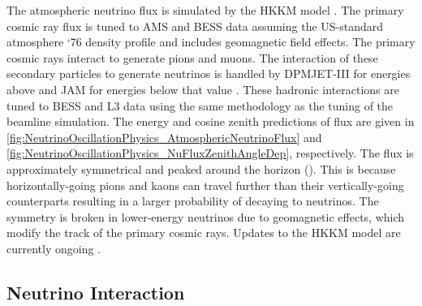 The atmospheric neutrino flux is simulated by the HKKM model \cite{Honda_2007, Honda:2011}. The primary cosmic ray flux is tuned to AMS \cite{Blau2002} and BESS \cite{Haino2004} data assuming the US-standard atmosphere `76 \cite{USStandardAtm} density profile and includes geomagnetic field effects. The primary cosmic rays interact to generate pions and muons. The interaction of these secondary particles to generate neutrinos is handled by DPMJET-III \cite{Roesler2001} for energies above  and JAM \cite{Niita2006, Honda:2011} for energies below that value . These hadronic interactions are tuned to BESS and L3 data \cite{Sanuki_2002, Achard_2004} using the same methodology as the tuning of the beamline simulation. The energy and cosine zenith predictions of  flux are given in \autoref{fig:NeutrinoOscillationPhysics_AtmosphericNeutrinoFlux} and \autoref{fig:NeutrinoOscillationPhysics_NuFluxZenithAngleDep}, respectively. The flux is approximately symmetrical and peaked around the horizon (). This is because horizontally-going pions and kaons can travel further than their vertically-going counterparts resulting in a larger probability of decaying to neutrinos. The symmetry is broken in lower-energy neutrinos due to geomagnetic effects, which modify the track of the primary cosmic rays. Updates to the HKKM model are currently ongoing \cite{Sato2022-ss}.

\subsection{Neutrino Interaction}

